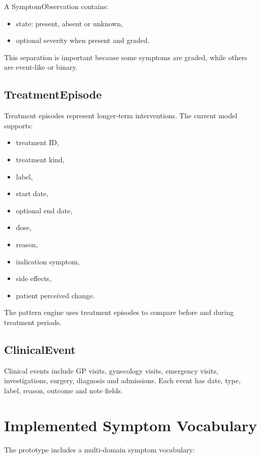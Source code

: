 \documentclass[11pt,a4paper]{article}
\begin{document}
A SymptomObservation contains:

\begin{itemize}
  \item state: present, absent or unknown,
  \item optional severity when present and graded.
\end{itemize}

This separation is important because some symptoms are graded, while others are event-like or binary.

\subsection{TreatmentEpisode}

Treatment episodes represent longer-term interventions. The current model supports:

\begin{itemize}
  \item treatment ID,
  \item treatment kind,
  \item label,
  \item start date,
  \item optional end date,
  \item dose,
  \item reason,
  \item indication symptom,
  \item side effects,
  \item patient perceived change.
\end{itemize}

The pattern engine uses treatment episodes to compare before and during treatment periods.

\subsection{ClinicalEvent}

Clinical events include GP visits, gynecology visits, emergency visits, investigations, surgery, diagnosis and admissions. Each event has date, type, label, reason, outcome and note fields.

\section{Implemented Symptom Vocabulary}

The prototype includes a multi-domain symptom vocabulary:
\end{document}
